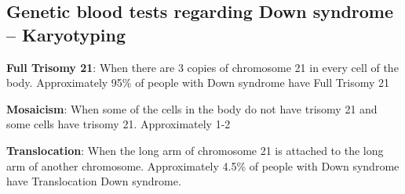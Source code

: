 \subsection{Genetic blood tests regarding Down syndrome – Karyotyping}

\textbf{Full Trisomy 21}: When there are 3 copies of chromosome 21 in every cell of the body.  Approximately 95\% of people with Down syndrome have Full Trisomy 21

\textbf{Mosaicism}: When some of the cells in the body do not have trisomy 21 and some cells have trisomy 21. Approximately 1-2%
 
\textbf{Translocation}: When the long arm of chromosome 21 is attached to the long arm of another chromosome. Approximately 4.5\% of people with Down syndrome have Translocation Down syndrome. 
